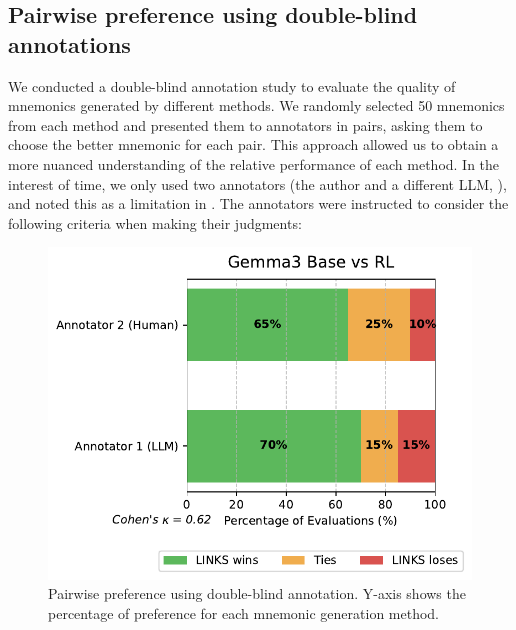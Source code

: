 \subsection{Pairwise preference using double-blind annotations} \label{sec:pairwise-preference}
We conducted a double-blind annotation study to evaluate the quality of mnemonics generated by different methods. We randomly selected 50 mnemonics from each method and presented them to annotators in pairs, asking them to choose the better mnemonic for each pair. This approach allowed us to obtain a more nuanced understanding of the relative performance of each method. In the interest of time, we only used two annotators (the author and a different LLM, \judgemodel), and noted this as a limitation in . The annotators were instructed to consider the following criteria when making their judgments:

\begin{figure}
  \centering
  \includegraphics[width=\linewidth]{figures/model_comparison.pdf}
  \caption{Pairwise preference using double-blind annotation. Y-axis shows the percentage of preference for each mnemonic generation method.}
\end{figure}
